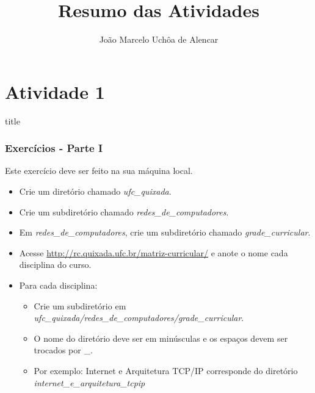 \documentclass{beamer}
\title{Resumo das Atividades}
\author[João Marcelo Uchôa de Alencar]{João Marcelo Uchôa de Alencar}
\institute{Universidade Federal do Ceará - Quixadá}
\begin{document}
   \begin{frame}
      \titlepage
   \end{frame}

   \begin{frame}
      \tableofcontents
   \end{frame}

\section{Atividade 1}
  \begin{frame}
     \begin{beamercolorbox}[sep=8pt,center,shadow=true,rounded=true]{title}
     \insertsectionhead\par%
     \end{beamercolorbox}
  \end{frame}

   \begin{frame}
      \frametitle{Exercícios - Parte I}
      Este exercício deve ser feito na sua máquina local.
      \begin{itemize}
         \item Crie um diretório chamado \textit{ufc\_quixada}.
	 \item Crie um subdiretório chamado \textit{redes\_de\_computadores}.
	 \item Em \textit{redes\_de\_computadores}, crie um subdiretório chamado \textit{grade\_curricular}.
         \item Acesse \url{http://rc.quixada.ufc.br/matriz-curricular/} e anote o nome cada disciplina do curso.
         \item Para cada disciplina:
	 \begin{itemize}
	    \item Crie um subdiretório em \textit{ufc\_quixada/redes\_de\_computadores/grade\_curricular}.
	    \item O nome do diretório deve ser em minúsculas e os espaços devem ser trocados por \_.
	    \item Por exemplo: Internet e Arquitetura TCP/IP corresponde do diretório \textit{internet\_e\_arquitetura\_tcpip}
	 \end{itemize}
      \end{itemize}
   \end{frame}
\end{document}
